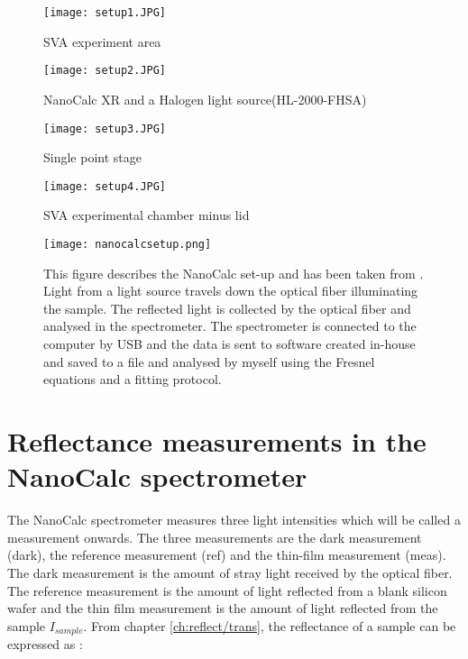 \documentclass[MasterThesisMain.tex]{subfiles}
\begin{document}
	\begin{figure}[ht] 
	  \begin{minipage}[b]{0.5\linewidth}
	    \centering
	    \texttt{[image: setup1.JPG]} 
	    \caption{SVA experiment area}
	    \label{fig:exparea}  
	    \vspace{4ex}
	  \end{minipage}%
	  \begin{minipage}[b]{0.5\linewidth}
	    \centering
	    \texttt{[image: setup2.JPG]} 
	    \caption{NanoCalc XR and a Halogen light source(HL-2000-FHSA)}
	    \label{fig:speclight} 
	    \vspace{4ex}
	  \end{minipage} 
	  \begin{minipage}[b]{0.5\linewidth}
	    \centering
	    \texttt{[image: setup3.JPG]} 
	    \caption{Single point stage} 
	    \label{fig:Singlestage}
	    \vspace{4ex}
	  \end{minipage}%
	  \begin{minipage}[b]{0.5\linewidth}
	    \centering
	    \texttt{[image: setup4.JPG]} 
	    \caption{SVA experimental chamber \break minus lid}
	    \label{fig:SVAchamber} 
	    \vspace{4ex}
	  \end{minipage} 
	\end{figure}
	
	\begin{figure}
	\centering
		\texttt{[image: nanocalcsetup.png]}
		\caption{This figure describes the NanoCalc set-up and has been taken from \cite{nanocalcmanual}. Light from a light source travels down the optical fiber illuminating the sample. The reflected light is collected by the optical fiber and analysed in the spectrometer. The spectrometer is connected to the computer by USB and the data is sent to software created in-house and saved to a file and analysed by myself using the Fresnel equations and a fitting protocol.}
		\label{fig:nanocalcsetup}
	\end{figure}
	
\section{Reflectance measurements in the NanoCalc spectrometer}
The NanoCalc spectrometer measures three light intensities which will be called a measurement onwards. The three measurements are the dark measurement (dark), the reference measurement (ref) and the thin-film measurement (meas). The dark measurement is the amount of stray light received by the optical fiber. The reference measurement is the amount of light reflected from a blank silicon wafer and the thin film measurement is the amount of light reflected from the sample $I_{sample}$. From chapter \ref{ch:reflect/trans}, the reflectance of a sample can be expressed as :
\end{document}
